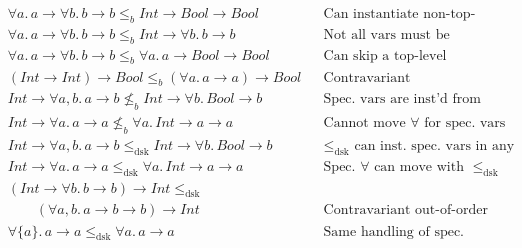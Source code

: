 \documentclass{article}
\begin{document}
\begin{align*}
&\forall a.\, a \to \forall b.\, b \to b \leq_b \mathit{Int} \to \mathit{Bool} \to \mathit{Bool} 
&& \text{Can instantiate non-top-level vars} \\
&\forall a.\, a \to \forall b.\, b \to b \leq_b \mathit{Int} \to \forall b.\, b \to b 
&& \text{Not all vars must be instantiated} \\
&\forall a.\, a \to \forall b.\, b \to b \leq_b \forall a.\, a \to \mathit{Bool} \to \mathit{Bool} 
&& \text{Can skip a top-level quantifier} \\
&(\mathit{Int} \to \mathit{Int}) \to \mathit{Bool} \leq_b (\forall a.\, a \to a) \to \mathit{Bool} 
&& \text{Contravariant instantiation} \\
&\mathit{Int} \to \forall a, b.\, a \to b \nleq_b \mathit{Int} \to \forall b.\, \mathit{Bool} \to b 
&& \text{Spec. vars are inst'd from the right} \\
&\mathit{Int} \to \forall a.\, a \to a \nleq_b \forall a.\, \mathit{Int} \to a \to a 
&& \text{Cannot move $\forall$ for spec. vars} \\
&\mathit{Int} \to \forall a, b.\, a \to b \leq_{\mathrm{dsk}} \mathit{Int} \to \forall b.\, \mathit{Bool} \to b 
&& \text{$\leq_{\mathrm{dsk}}$ can inst. spec. vars in any order} \\
&\mathit{Int} \to \forall a.\, a \to a \leq_{\mathrm{dsk}} \forall a.\, \mathit{Int} \to a \to a 
&& \text{Spec. $\forall$ can move with $\leq_{\mathrm{dsk}}$} \\
&(\mathit{Int} \to \forall b.\, b \to b) \to \mathit{Int} \leq_{\mathrm{dsk}} \\
&\qquad (\forall a, b.\, a \to b \to b) \to \mathit{Int} 
&& \text{Contravariant out-of-order inst.} \\
&\forall\{a\}.\, a \to a \leq_{\mathrm{dsk}} \forall a.\, a \to a 
&& \text{Same handling of spec. and gen. vars}
\end{align*}
\end{document}
